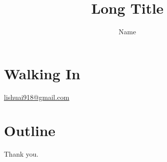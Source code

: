 \documentclass{beamer}
\title[Short Title]{Long Title}
\author{Name}
\date{}
\begin{document}
\section*{Walking In}
    \begin{frame}[plain, label=walk_in]
      \vspace{5mm}
      \begin{mdframed}[style=description]
          \begin{center}
            {\Huge \inserttitle}\linebreak
            \vspace{5mm}

            {\large \textsc{\insertauthor}}\linebreak
            \insertinstitute\linebreak
            \insertdate\linebreak
          \end{center}
          \begin{flushright}
            {\footnotesize
              \href{mailto: lishuai918@gmail.com}{{\faEnvelope}  lishuai918@gmail.com}
            }
          \end{flushright}
      \end{mdframed}
    \end{frame}
\note{}


\section*{Outline}
\frame{\tableofcontents[pausesections]}



\begin{frame}[label=thank_you]
  \vspace{-1.5in}
  \begin{mdframed}[style=description]
    {\large Thank you.}
  \end{mdframed}
\end{frame}
\end{document}
